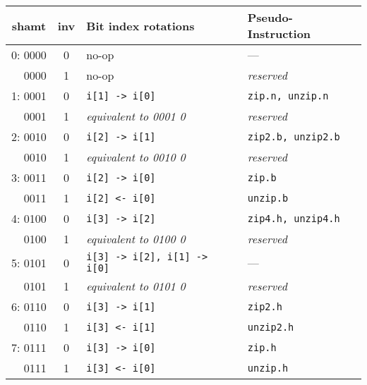 \begin{table}[h]
\begin{small}
\begin{center}
\begin{tabular}{r c l l}
\multicolumn{1}{c}{shamt} &
\multicolumn{1}{c}{inv} &
Bit index rotations &
Pseudo-Instruction \\

\hline

 0: 0000 & 0 & no-op                            & ---                    \\
    0000 & 1 & no-op                            & {\it reserved}         \\
 1: 0001 & 0 & {\tt i[1] -> i[0]}               & {\tt zip.n, unzip.n}   \\
    0001 & 1 & {\it equivalent to 0001 0}       & {\it reserved}         \\
 2: 0010 & 0 & {\tt i[2] -> i[1]}               & {\tt zip2.b, unzip2.b} \\
    0010 & 1 & {\it equivalent to 0010 0}       & {\it reserved}         \\
 3: 0011 & 0 & {\tt i[2] -> i[0]}               & {\tt zip.b}            \\
    0011 & 1 & {\tt i[2] <- i[0]}               & {\tt unzip.b}          \\

\hline

 4: 0100 & 0 & {\tt i[3] -> i[2]}               & {\tt zip4.h, unzip4.h} \\
    0100 & 1 & {\it equivalent to 0100 0}       & {\it reserved}         \\
 5: 0101 & 0 & {\tt i[3] -> i[2], i[1] -> i[0]} & ---                    \\
    0101 & 1 & {\it equivalent to 0101 0}       & {\it reserved}         \\
 6: 0110 & 0 & {\tt i[3] -> i[1]}               & {\tt zip2.h}           \\
    0110 & 1 & {\tt i[3] <- i[1]}               & {\tt unzip2.h}         \\
 7: 0111 & 0 & {\tt i[3] -> i[0]}               & {\tt zip.h}            \\
    0111 & 1 & {\tt i[3] <- i[0]}               & {\tt unzip.h}          \\

\hline


\end{tabular}
\end{center}
\end{small}
\end{table}
